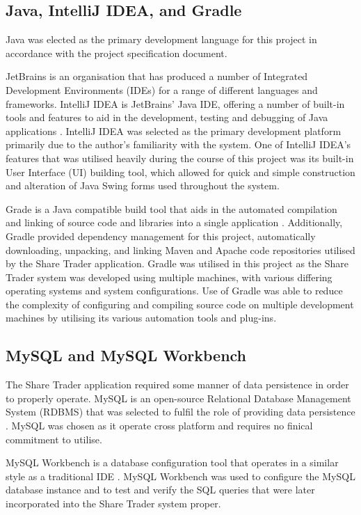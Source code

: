 \documentclass[12pt, a4paper,titlepage]{article}
\begin{document}
\subsection{Java, IntelliJ IDEA, and Gradle}
Java was elected as the primary development language for this project in
accordance with the project specification document.

JetBrains is an organisation that has produced a number of Integrated
Development Environments (IDEs) for a range of different languages and
frameworks.
IntelliJ IDEA is JetBrains' Java IDE, offering a number of built-in tools and
features to aid in the development, testing and debugging of Java
applications \cite{Idea}.
IntelliJ IDEA was selected as the primary development platform primarily due to
the author's familiarity with the system.
One of IntelliJ IDEA's features that was utilised heavily during the course
of this project was its built-in User Interface (UI) building tool, which
allowed for quick and simple construction and alteration of Java Swing forms
used throughout the system.

Grade is a Java compatible build tool that aids in the automated compilation
and linking of source code and libraries into a single application
\cite{Gradle}. 
Additionally, Gradle provided dependency management for this project,
automatically downloading, unpacking, and linking Maven and Apache code
repositories utilised by the Share Trader application.
Gradle was utilised in this project as the Share Trader system was developed
using multiple machines, with various differing operating systems and system
configurations.
Use of Gradle was able to reduce the complexity of configuring and compiling
source code on multiple development machines by utilising its various
automation tools and plug-ins.

\subsection{MySQL and MySQL Workbench}
The Share Trader application required some manner of data persistence in order
to properly operate.
MySQL is an open-source Relational Database Management System (RDBMS) that was
selected to fulfil the role of providing data persistence \cite{Mysql}.
MySQL was chosen as it operate cross platform and requires no finical commitment
to utilise.

MySQL Workbench is a database configuration tool that operates in a similar
style as a traditional IDE \cite{Workbench}.
MySQL Workbench was used to configure the MySQL database instance and to test
and verify the SQL queries that were later incorporated into the Share
Trader system proper.
\end{document}

